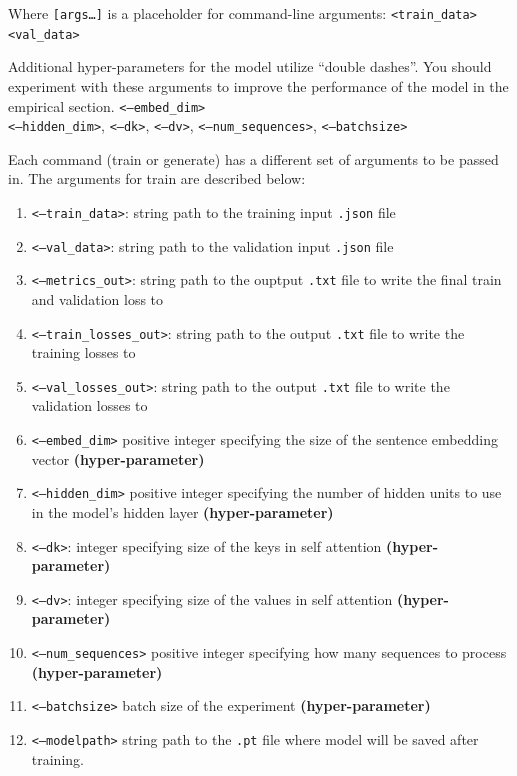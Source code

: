 \documentclass[11pt,addpoints,answers]{exam}
\begin{document}
Where \texttt{[args\dots]} is a placeholder for command-line arguments: \texttt{<train\_data>} \texttt{<val\_data>}

Additional hyper-parameters for the model utilize ``double dashes''. You should experiment with these arguments to improve the performance of the model in the empirical section. \texttt{<--embed\_dim>} \\ \texttt{<--hidden\_dim>}, \texttt{<--dk>}, \texttt{<--dv>}, \texttt{<--num\_sequences>}, \texttt{<--batch\textunderscore size>}

Each command (train or generate) has a different set of arguments to be passed in.
The arguments for train are described below:
\begin{enumerate}
    \item \texttt{<--train\_data>}: string path to the training input \texttt{.json} file 
    \item \texttt{<--val\_data>}: string path to the validation input \texttt{.json} file 
    \item \texttt{<--metrics\_out>}: string path to the ouptput \texttt{.txt} file to write the final train and validation loss to
    \item \texttt{<--train\_losses\_out>}: string path to the output \texttt{.txt} file to write the training losses to
    \item \texttt{<--val\_losses\_out>}: string path to the output \texttt{.txt} file to write the validation losses to
     \item \texttt{<--embed\_dim>} positive integer specifying the size of the sentence embedding vector \textbf{(hyper-parameter)}
    \item \texttt{<--hidden\_dim>} positive integer specifying the number of hidden units to use in the model's hidden layer \textbf{(hyper-parameter)}
    \item \texttt{<--dk>}: integer specifying size of the keys in self attention \textbf{(hyper-parameter)}
    \item \texttt{<--dv>}: integer specifying size of the values in self attention \textbf{(hyper-parameter)}
    \item \texttt{<--num\_sequences>} positive integer specifying how many sequences to process \textbf{(hyper-parameter)}
    \item \texttt{<--batch\textunderscore size>} batch size of the experiment \textbf{(hyper-parameter)}
    \item \texttt{<--model\textunderscore path>} string path to the \texttt{.pt} file where model will be saved after training.
\end{enumerate}
\end{document}
